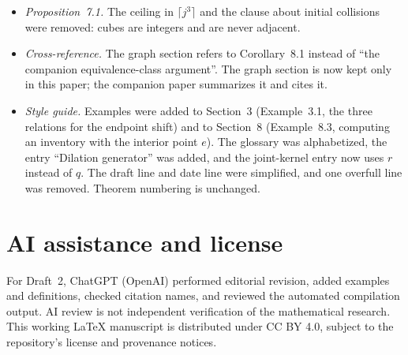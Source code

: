 \documentclass[12pt,letterpaper]{article}
\begin{document}
\begin{itemize}
  $\delta=\frac12$, which Claude confirmed by direct maximization.
\item \emph{Proposition~7.1.}  The ceiling in $\lceil j^3\rceil$ and the
  clause about initial collisions were removed: cubes are integers and
  are never adjacent.
\item \emph{Cross-reference.}  The graph section refers to
  Corollary~8.1 instead of ``the companion equivalence-class argument''.
  The graph section is now kept only in this paper; the companion paper
  summarizes it and cites it.
\item \emph{Style guide.}  Examples were added to Section~3
  (Example~3.1, the three relations for the endpoint shift) and to
  Section~8 (Example~8.3, computing an inventory with the interior point
  $e$).  The glossary was alphabetized, the entry ``Dilation generator''
  was added, and the joint-kernel entry now uses $r$ instead of $q$.  The
  draft line and date line were simplified, and one overfull line was
  removed.  Theorem numbering is unchanged.
\end{itemize}

\section{AI assistance and license}
For Draft~2, ChatGPT (OpenAI) performed editorial revision, added examples
and definitions, checked citation names, and reviewed the
automated compilation output. AI review is not independent
verification of the mathematical research.
This working LaTeX manuscript is distributed under CC BY 4.0,
subject to the repository's license and provenance notices.
\end{document}
